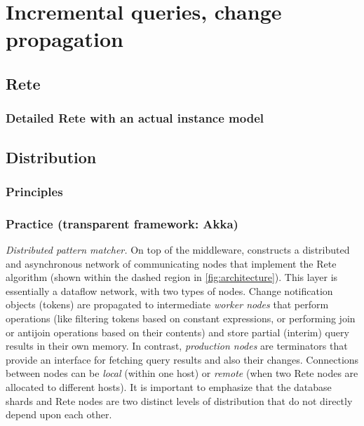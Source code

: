 \section{Incremental queries, change propagation}



\subsection{Rete}


\subsubsection{Detailed Rete with an actual instance model}






\subsection{Distribution}


\subsubsection{Principles}


\subsubsection{Practice (transparent framework: Akka)}





\emph{Distributed pattern matcher.}\label{distributed_pattern_matcher}
On top of the middleware, \iqd{} constructs a distributed and asynchronous network of communicating nodes that implement the Rete~\cite{Forgy} algorithm (shown within the dashed region in \autoref{fig:architecture}). This layer is essentially a dataflow network, with two types of nodes. Change notification objects (tokens) are propagated to intermediate \emph{worker nodes} that perform operations (like filtering tokens based on constant expressions, or performing join or antijoin operations based on their contents) and
store partial (interim) query results in their own memory. In contrast, \emph{production nodes} are terminators that provide an interface for fetching query results and also their changes. Connections between nodes can be \emph{local} (within one host) or \emph{remote} (when two Rete nodes are allocated to different hosts). It is important to emphasize that the database shards and Rete nodes are two distinct levels of distribution that do not directly depend upon each other.

